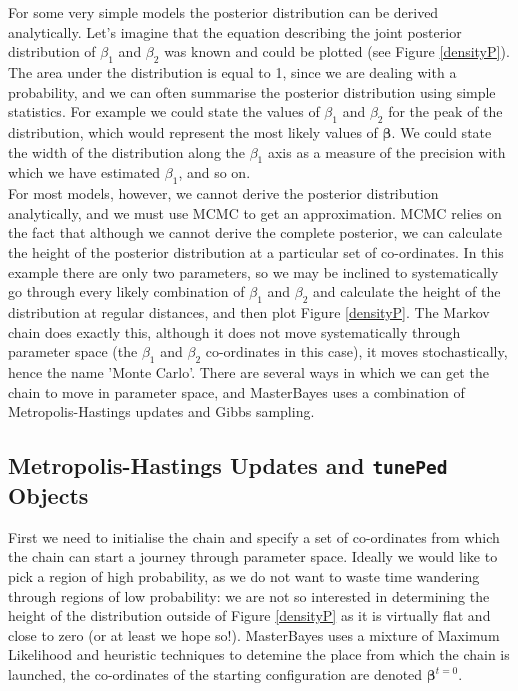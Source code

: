 \documentclass{article}
\begin{document}
For some very simple models the posterior distribution can be derived analytically. Let's imagine that the equation describing the joint posterior distribution of $\beta_{1}$ and $\beta_{2}$ was known and could be plotted (see Figure \ref{densityP}).  The area under the distribution is equal to 1, since we are dealing with a probability, and we can often summarise the posterior distribution using simple statistics.  For example we could state the values of $\beta_{1}$ and $\beta_{2}$ for the peak of the distribution, which would represent the most likely values of $\bm{\beta}$.  We could state the width of the distribution along the $\beta_{1}$ axis as a measure of the precision with which we have estimated $\beta_{1}$, and so on.\\

For most models, however, we cannot derive the posterior distribution analytically, and we must use MCMC to get an approximation.  MCMC relies on the fact that although we cannot derive the complete posterior, we can calculate the height of the posterior distribution at a particular set of co-ordinates. In this example there are only two parameters, so we may be inclined to systematically go through every likely combination of $\beta_{1}$ and $\beta_{2}$ and calculate the height of the distribution at regular distances, and then plot Figure \ref{densityP}.  The Markov chain does exactly this, although it does not move systematically through parameter space (the $\beta_{1}$ and $\beta_{2}$ co-ordinates in this case), it moves stochastically, hence the name 'Monte Carlo'.  There are several ways in which we can get the chain to move in parameter space, and MasterBayes uses a combination of Metropolis-Hastings updates and Gibbs sampling.\\   

\subsection{Metropolis-Hastings Updates and \texttt{tunePed} Objects}

First we need to initialise the chain and specify a set of co-ordinates from which the chain can start a journey through parameter space. Ideally we would like to pick a region of high probability, as we do not want to waste time wandering through regions of low probability: we are not so interested in determining the height of the distribution outside of  Figure \ref{densityP} as it is virtually flat and close to zero (or at least we hope so!).  MasterBayes uses a mixture of Maximum Likelihood and heuristic techniques to detemine the place from which the chain is launched, the co-ordinates of the starting configuration are denoted $\bm{\beta}^{t=0}$.\\
\end{document}
